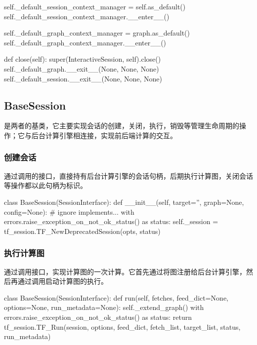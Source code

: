 \begin{content}
\begin{content}
\begin{leftbar}
\begin{python}
    self._default_session_context_manager = self.as_default()
    self._default_session_context_manager.__enter__()

    self._default_graph_context_manager = graph.as_default()
    self._default_graph_context_manager.__enter__()

  def close(self):
    super(InteractiveSession, self).close()
    self._default_graph.__exit__(None, None, None)
    self._default_session.__exit__(None, None, None)
\end{python}
\end{leftbar}

\subsection{BaseSession}

是两者的基类，它主要实现会话的创建，关闭，执行，销毁等管理生命周期的操作；它与后台计算引擎相连接，实现前后端计算的交互。

\subsubsection{创建会话}

通过调用的接口，直接持有后台计算引擎的会话句柄，后期执行计算图，关闭会话等操作都以此句柄为标识。

\begin{leftbar}
\begin{python}
class BaseSession(SessionInterface):
  def __init__(self, target='', graph=None, config=None):
    # ignore implements...
    with errors.raise_exception_on_not_ok_status() as status:
      self._session = 
        tf_session.TF_NewDeprecatedSession(opts, status)
\end{python}
\end{leftbar}

\subsubsection{执行计算图}

通过调用接口，实现计算图的一次计算。它首先通过将图注册给后台计算引擎，然后再通过调用启动计算图的执行。

\begin{leftbar}
\begin{python}
class BaseSession(SessionInterface):
  def run(self, 
    fetches, feed_dict=None, options=None, run_metadata=None):
    self._extend_graph()
    with errors.raise_exception_on_not_ok_status() as status:
      return tf_session.TF_Run(session, 
        options, feed_dict, fetch_list, 
        target_list, status, run_metadata)
  

\end{python}
\end{leftbar}
\end{content}
\end{content}
